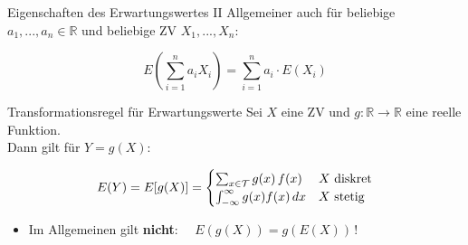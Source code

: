 \documentclass[
  10pt,
  ignorenonframetext,
]{beamer}
\providecommand{\tightlist}{%
  \setlength{\itemsep}{0pt}\setlength{\parskip}{0pt}}
\begin{document}
\begin{frame}{Eigenschaften des Erwartungswertes II}
\protect\hypertarget{eigenschaften-des-erwartungswertes-ii}{}
Allgemeiner auch für beliebige \(a_1, ..., a_n \in \mathbb{R}\) und
beliebige ZV \(X_1, ..., X_n\):

\[E\left( \sum_{i=1}^n a_iX_i \right) = \sum_{i=1}^n a_i \cdot E(X_i)\]
\end{frame}

\begin{frame}{Transformationsregel für Erwartungswerte}
\protect\hypertarget{transformationsregel-fuxfcr-erwartungswerte}{}
Sei \(X\) eine ZV und \(g:\mathbb{R} \to \mathbb{R}\) eine reelle
Funktion.\\
Dann gilt für \(Y = g(X)\):

\[
E(Y) = E[g(X)] = \begin{cases} \sum_{x \in {\cal T}} g(x)\, f(x) & X \text{ diskret} \\
  \int_{-\infty}^\infty g(x) f(x) \,dx & X \text{ stetig} \end{cases}
\]

\begin{itemize}
\tightlist
\item
  Im Allgemeinen gilt \textbf{nicht}: \(\quad E(g(X)) = g(E(X))\,\)!
\end{itemize}

\end{frame}
\end{document}
